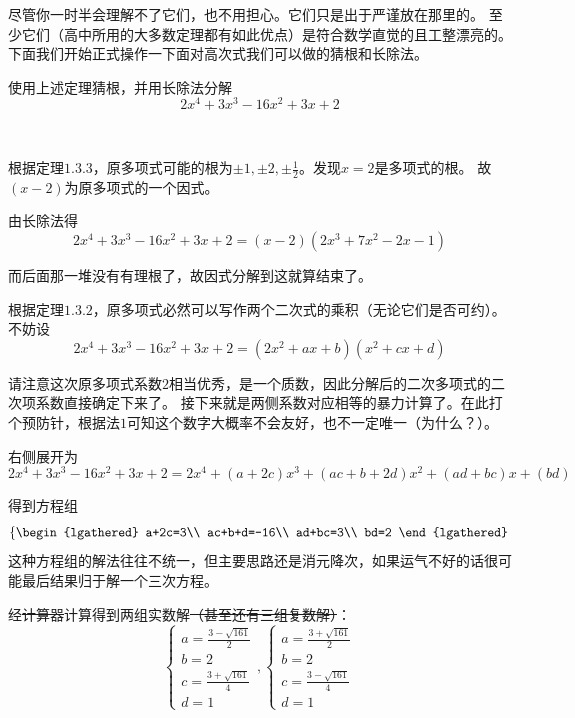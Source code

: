 尽管你一时半会理解不了它们，也不用担心。它们只是出于严谨放在那里的。
至少它们（高中所用的大多数定理都有如此优点）是符合数学直觉的且工整漂亮的。
下面我们开始正式操作一下面对高次式我们可以做的猜根和长除法。
\begin{example}
    使用上述定理猜根，并用长除法分解
    \[2x^4+3x^3-16x^2+3x+2\]
\end{example}

\begin{jie}
\ 
\begin{way1}
    根据定理$1.3.3$，原多项式可能的根为$\pm1,\pm2,\pm\frac{1}{2}$。发现$x=2$是多项式的根。
    故$(x-2)$为原多项式的一个因式。
    
    由长除法得\[2x^4+3x^3-16x^2+3x+2=(x-2)(2x^3+7x^2-2x-1)\]
    
    而后面那一堆没有有理根了，故因式分解到这就算结束了。
\end{way1}
\begin{way2}
    根据定理$1.3.2$，原多项式必然可以写作两个二次式的乘积（无论它们是否可约）。
    不妨设\[2x^4+3x^3-16x^2+3x+2=(2x^2+ax+b)(x^2+cx+d)\]
    
    请注意这次原多项式系数$2$相当优秀，是一个质数，因此分解后的二次多项式的二次项系数直接确定下来了。
    接下来就是两侧系数对应相等的暴力计算了。在此打个预防针，根据法$1$可知这个数字大概率不会友好，也不一定唯一（为什么？）。

    右侧展开为
    \[2x^4+3x^3-16x^2+3x+2=2x^4+(a+2c)x^3+(ac+b+2d)x^2+(ad+bc)x+(bd)\]
    
    得到方程组
    \[  
    \left\{
    \begin{lgathered}
    a+2c=3\\
    ac+b+d=-16\\
    ad+bc=3\\
    bd=2
    \end{lgathered}
    \right.
    \]
    这种方程组的解法往往不统一，但主要思路还是消元降次，如果运气不好的话很可能最后结果归于解一个三次方程。
    
    经\sout{计算器}计算得到两组实数解\sout{（甚至还有三组复数解）}：
    \begin{equation*}
    \left\{
    {
    \begin{array}{*{20}{c}}
        {a=\frac{3-\sqrt{161}}{2}}\\ 
        {b=2\ \ \ \ \ \ \ }\\  
        {c=\frac{3+\sqrt{161}}{4}}\\
        {d=1\ \ \ \ \ \ \ }
    \end{array}
    }
    \right.,
    \left\{
    {
    \begin{array}{*{20}{c}}
        {a=\frac{3+\sqrt{161}}{2}}\\  
        {b=2\ \ \ \ \ \ \ }\\
        {c=\frac{3-\sqrt{161}}{4}}\\
        {d=1\ \ \ \ \ \ \ }
    \end{array}
    }
    \right.    
    \end{equation*}


\end{way2}
\end{jie}
